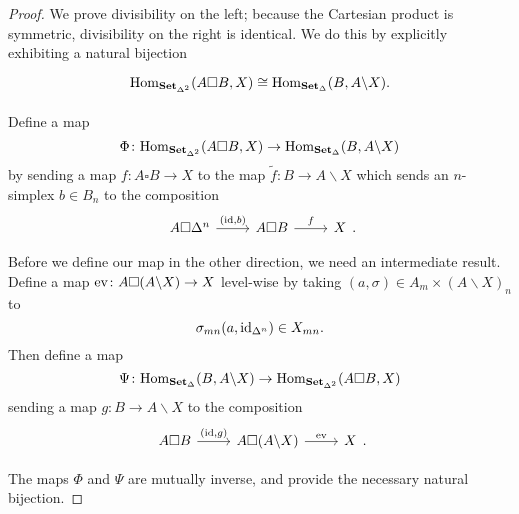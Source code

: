 \documentclass[main.tex]{subfiles}
\begin{document}
\begin{proof}
  We prove divisibility on the left; because the Cartesian product is symmetric, divisibility on the right is identical. We do this by explicitly exhibiting a natural bijection
  \begin{equation*}
    \begin{tikzcd}
      \Hom_{\SSSet}(A \square B, X) \cong \Hom_{\SSet}(B, A \backslash X).
    \end{tikzcd}
  \end{equation*}

  Define a map
  \begin{equation*}
    \Phi\colon \mathrm{Hom}_{\mathbf{Set}_{\Delta^{2}}}(A \square B, X) \to \mathrm{Hom}_{\mathbf{Set}_{\Delta}}(B, A \backslash X)
  \end{equation*}
  by sending a map $f\colon A \square B \to X$ to the map $\tilde{f}\colon B \to A \backslash X$ which sends an $n$-simplex $b \in B_{n}$ to the composition
  \begin{equation*}
    \begin{tikzcd}
      A \square \Delta^{n}
      \arrow[r, "{(\id, b)}"]
      & A \square B
      \arrow[r, "f"]
      & X
    \end{tikzcd}.
  \end{equation*}

  Before we define our map in the other direction, we need an intermediate result. Define a map $\mathrm{ev}\colon A \square (A \backslash X) \to X$ level-wise by taking $(a, \sigma) \in A_{m} \times (A \backslash X)_{n}$ to
  \begin{equation*}
    \sigma_{mn}(a, \mathrm{id}_{\Delta^{n}}) \in X_{mn}.
  \end{equation*}
  Then define a map
  \begin{equation*}
    \Psi\colon \mathrm{Hom}_{\mathbf{Set}_{\Delta}}(B, A \backslash X) \to \mathrm{Hom}_{\mathbf{Set}_{\Delta^{2}}}(A \square B, X)
  \end{equation*}
  sending a map $g\colon B \to A \backslash X$ to the composition
  \begin{equation*}
    \begin{tikzcd}
      A \square B
      \arrow[r, "{(\id, g)}"]
      & A \square (A \backslash X)
      \arrow[r, "\ev"]
      & X
    \end{tikzcd}.
  \end{equation*}

  The maps $\Phi$ and $\Psi$ are mutually inverse, and provide the necessary natural bijection.


\end{proof}
\end{document}
